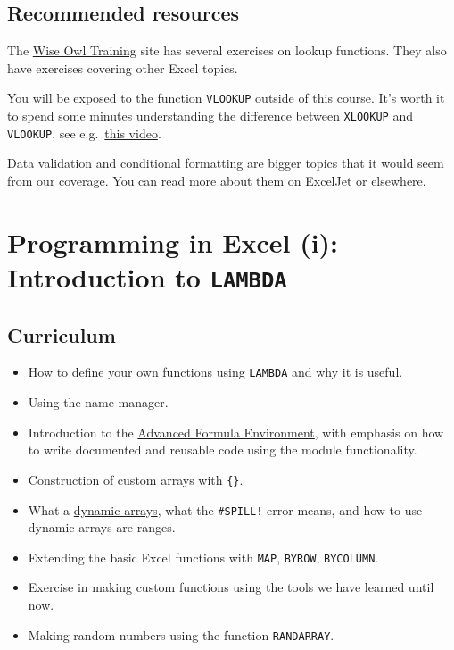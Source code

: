 \documentclass[
  letterpaper,
  DIV=11,
  numbers=noendperiod]{scrreprt}
\begin{document}
\hypertarget{recommended-resources-2}{%
\section{Recommended resources}\label{recommended-resources-2}}

The
\href{https://www.wiseowl.co.uk/excel/exercises/standard/lookup-functions/}{Wise
Owl Training} site has several exercises on lookup functions. They also
have exercises covering other Excel topics.

You will be exposed to the function \texttt{VLOOKUP} outside of this
course. It's worth it to spend some minutes understanding the difference
between \texttt{XLOOKUP} and \texttt{VLOOKUP}, see
e.g.~\href{https://www.youtube.com/watch?v=HXU7lsd0ftA}{this video}.

Data validation and conditional formatting are bigger topics that it
would seem from our coverage. You can read more about them on ExcelJet
or elsewhere.


\hypertarget{programming-in-excel-i-introduction-to-lambda}{%
\chapter{\texorpdfstring{Programming in Excel (i): Introduction to
\texttt{LAMBDA}}{Programming in Excel (i): Introduction to LAMBDA}}\label{programming-in-excel-i-introduction-to-lambda}}

\hypertarget{curriculum-3}{%
\section{Curriculum}\label{curriculum-3}}

\begin{itemize}
\item
  How to define your own functions using \texttt{LAMBDA} and why it is
  useful.
\item
  Using the name manager.
\item
  Introduction to the
  \href{https://www.microsoft.com/en-us/garage/profiles/advanced-formula-environment-a-microsoft-garage-project/}{Advanced
  Formula Environment}, with emphasis on how to write documented and
  reusable code using the module functionality.
\item
  Construction of custom arrays with \texttt{\{\}}.
\item
  What a
  \href{https://exceljet.net/articles/dynamic-array-formulas-in-excel}{dynamic
  arrays}, what the \texttt{\#SPILL!} error means, and how to use
  dynamic arrays are ranges.
\item
  Extending the basic Excel functions with \texttt{MAP}, \texttt{BYROW},
  \texttt{BYCOLUMN}.
\item
  Exercise in making custom functions using the tools we have learned
  until now.
\item
  Making random numbers using the function \texttt{RANDARRAY}.
\end{itemize}
\end{document}
